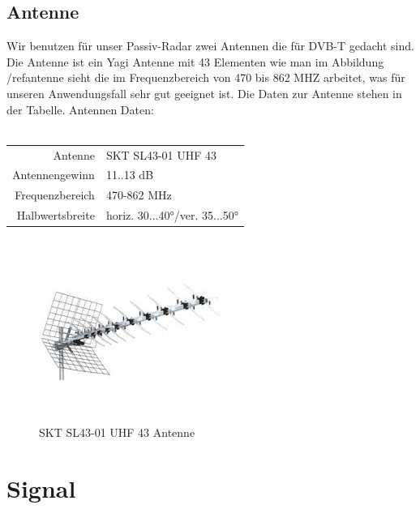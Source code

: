 \subsection{Antenne}
Wir benutzen für unser Passiv-Radar zwei Antennen die für DVB-T gedacht sind. Die Antenne ist ein Yagi Antenne mit 43 Elementen wie man im Abbildung /ref{antenne} sieht die im Frequenzbereich von 470 bis 862 MHZ arbeitet, was für unseren Anwendungsfall sehr gut geeignet ist.
Die Daten zur Antenne stehen in der Tabelle. Antennen Daten:\\ \\
\begin{tabular}[h]{rl}
    Antenne         & SKT SL43-01 UHF 43            \\
    Antennengewinn  & 11..13 dB                     \\
    Frequenzbereich & 470-862 MHz                   \\
    Halbwertsbreite & horiz. 30...40°/ver. 35...50° \\
\end{tabular}
\begin{figure}
    \centering
    \includegraphics[width=\textwidth]{images/antenne.png}
    \caption{SKT SL43-01 UHF 43  Antenne}\label{antenne}
\end{figure}
\section{Signal}
